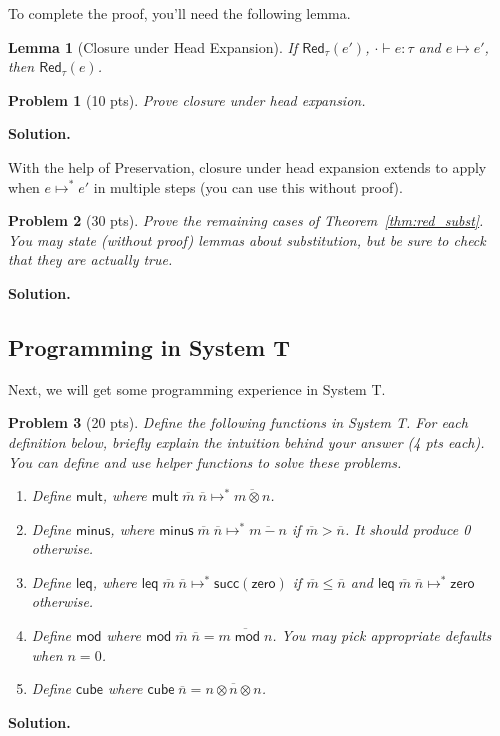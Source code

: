 \documentclass{article}
\newcommand{\m}[1]{\mathsf{#1}}
\newcommand{\step}{\mapsto}
\newcommand{\num}[1]{\overline{#1}}
\newcommand{\mstep}{\step^{*}}
\newcommand{\zero}{\m{zero}}
\renewcommand{\succ}[1]{\m{succ}(#1)}
\newcommand{\Red}{\m{Red}}
\newtheorem{problem}{Problem}
\newtheorem{lemma}{Lemma}
\newenvironment{solution}{\textbf{Solution.}}{}
\begin{document}
To complete the proof, you'll need the following lemma.
\begin{lemma}[Closure under Head Expansion]
  If $\Red_{\tau}(e')$,
  $\cdot \vdash e : \tau$ and $e \step e'$, then $\Red_{\tau}(e)$.
\end{lemma}

\begin{problem}[10 pts]
  Prove closure under head expansion.
\end{problem}

\begin{solution}

\end{solution}

With the help of Preservation, closure under head expansion extends to
apply when $e \mstep e'$ in multiple steps (you can use this without
proof).

\begin{problem}[30 pts]
  Prove the remaining cases of Theorem~\ref{thm:red_subst}.
  You may state (without proof) lemmas about substitution, but be sure
  to check that they are actually true.
\end{problem}

\begin{solution}

\end{solution}

\subsection{Programming in System T}

Next, we will get some programming experience in System T.

\begin{problem}[20 pts]
    Define the following functions in System T. For each definition below,
    briefly explain the intuition behind your answer (4 pts each).
    You can define and use helper functions to solve these problems.

    \begin{enumerate}
        \item Define $\m{mult}$, where $\m{mult} \; \num{m} \; \num{n} \mstep \num{m \otimes n}$.
        \item Define $\m{minus}$, where $\m{minus} \; \num{m} \; \num{n} \mstep \num{m - n}$ if $\num{m} > \num{n}$. It should produce 0 otherwise.
        \item Define $\m{leq}$, where $\m{leq} \; \num{m} \; \num{n} \mstep \succ{\zero}$ if $\num{m} \leq \num{n}$ and
        $\m{leq} \; \num{m} \; \num{n} \mstep \zero$ otherwise.
        \item Define $\m{mod}$ where $\m{mod} \; \num{m} \; \num{n} = \num{m \; \m{mod} \; n}$. You may pick appropriate defaults when $n = 0$.
        \item Define $\m{cube}$ where $\m{cube} \; \num{n} = \num{n \otimes n \otimes n}$.
    \end{enumerate}

\end{problem}


\begin{solution}
  
\end{solution}
\end{document}

